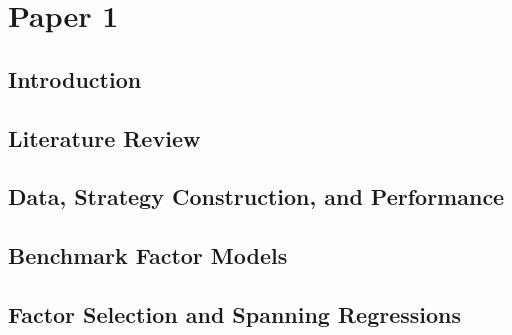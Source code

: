 \documentclass[12pt, oneside, letterpaper]{report}
\begin{document}


\clearpage

\clearpage

\clearpage

\clearpage
{\singlespacing \tableofcontents}
\clearpage

\clearpage
{\singlespacing \listoftables \clearpage \listoffigures}
\clearpage



\chapter*{Paper 1}
\setcounter{section}{0}



\section{Introduction}
\label{sec:introduction}


\section{Literature Review}
\label{sec:literature}


\section{Data, Strategy Construction, and Performance}
\label{sec:data}


\section{Benchmark Factor Models}
\label{sec:benchmarks}


\section{Factor Selection and Spanning Regressions}
\label{sec:factor_selection}

\end{document}
